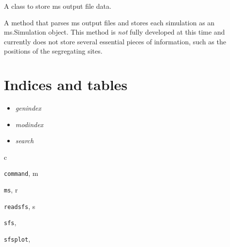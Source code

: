 \documentclass[letterpaper,10pt,english]{sphinxmanual}
\begin{document}
\begin{fulllineitems}
\label{index:readsfs.msData}
A class to store ms output file data.

\begin{fulllineitems}
\label{index:readsfs.msData.get_sims}
A method that parses ms output files and stores each simulation
as an ms.Simulation object.  This method is \emph{not} fully developed
at this time and currently does not store several essential pieces of
information, such as the positions of the segregating sites.

\end{fulllineitems}


\end{fulllineitems}



\chapter{Indices and tables}
\label{index:indices-and-tables}\begin{itemize}
\item {} 
\emph{genindex}

\item {} 
\emph{modindex}

\item {} 
\emph{search}

\end{itemize}


\renewcommand{\indexname}{Python Module Index}
\begin{theindex}
\def\bigletter#1{{\Large\sffamily#1}\nopagebreak\vspace{1mm}}
\bigletter{c}
\item {\texttt{command}}, \pageref{index:module-command}
\indexspace
\bigletter{m}
\item {\texttt{ms}}, \pageref{index:module-ms}
\indexspace
\bigletter{r}
\item {\texttt{readsfs}}, \pageref{index:module-readsfs}
\indexspace
\bigletter{s}
\item {\texttt{sfs}}, \pageref{index:module-sfs}
\item {\texttt{sfsplot}}, \pageref{index:module-sfsplot}
\end{theindex}

\renewcommand{\indexname}{Index}
\printindex
\end{document}
